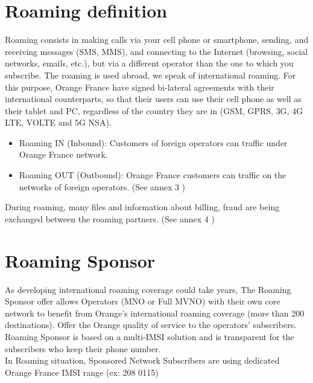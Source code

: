 \section{Roaming definition}

\-\hspace{0.5cm} Roaming consists in making calls via your cell phone or smartphone, sending, and receiving messages (\acs{SMS}, \acs{MMS}), and connecting to the Internet (browsing, social networks, emails, etc.), but via a different operator than the one to which you subscribe. The roaming is used abroad, we speak of international roaming. For this purpose, Orange France have signed bi-lateral agreements with their international counterparts, so that their users can use their cell phone as well as their tablet and \acs{PC}, regardless of the country they are in (\acs{GSM}, \acs{GPRS}, \acs{3G}, \acs{4G} \acs{LTE}, \acs{VOLTE} and \acs{5G} \acs{NSA}). 

\begin{itemize}
    \setlength\itemsep{0.2em}
    \item Roaming IN (Inbound): Customers of foreign operators can traffic under Orange France network.  
    \item Roaming OUT (Outbound): Orange France customers can traffic on the networks of foreign operators. (See annex 3 \cite{annexes}) 
\end{itemize}

During roaming, many files and information about billing, fraud are being exchanged between the roaming partners. (See annex 4 \cite{annexes})  \\

\section{Roaming Sponsor}
\-\hspace{0.5cm} As developing international roaming coverage could take years, The Roaming Sponsor offer allows Operators (\acs{MNO} or Full \acs{MVNO}) with their own core network to benefit from Orange's international roaming coverage (more than 200 destinations). Offer the Orange quality of service to the operators’ subscribers. Roaming Sponsor is based on a multi-\acs{IMSI} solution and is transparent for the subscribers who keep their phone number. \\

In Roaming situation, Sponsored Network Subscribers are using dedicated Orange France \acs{IMSI} range (ex: 208 0115)\\

